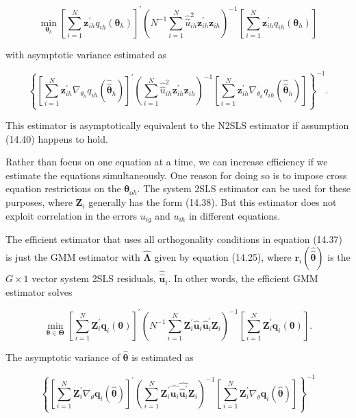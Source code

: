 \documentclass[10pt]{article}
\begin{document}
$$
\min _{\boldsymbol{\theta}_{h}}\left[\sum_{i=1}^{N} \mathbf{z}_{i h}^{\prime} q_{i h}\left(\boldsymbol{\theta}_{h}\right)\right]^{\prime}\left(N^{-1} \sum_{i=1}^{N} \hat{\hat{u}}_{i h}^{2} \mathbf{z}_{i h}^{\prime} \mathbf{z}_{i h}\right)^{-1}\left[\sum_{i=1}^{N} \mathbf{z}_{i h}^{\prime} q_{i h}\left(\boldsymbol{\theta}_{h}\right)\right]
$$

with asymptotic variance estimated as

$$
\left\{\left[\sum_{i=1}^{N} \mathbf{z}_{i h}^{\prime} \nabla_{\theta_{h}} q_{i h}\left(\hat{\hat{\boldsymbol{\theta}}}_{h}\right)\right]^{\prime}\left(\sum_{i=1}^{N} \hat{\hat{u}}_{i h}^{2} \mathbf{z}_{i h}^{\prime} \mathbf{z}_{i h}\right)^{-1}\left[\sum_{i=1}^{N} \mathbf{z}_{i h}^{\prime} \nabla_{\theta_{h}} q_{i h}\left(\hat{\hat{\boldsymbol{\theta}}}_{h}\right)\right]\right\}^{-1} .
$$

This estimator is asymptotically equivalent to the N2SLS estimator if assumption (14.40) happens to hold.

Rather than focus on one equation at a time, we can increase efficiency if we estimate the equations simultaneously. One reason for doing so is to impose cross equation restrictions on the $\boldsymbol{\theta}_{\mathrm{o} h}$. The system 2SLS estimator can be used for these purposes, where $\mathbf{Z}_{i}$ generally has the form (14.38). But this estimator does not exploit correlation in the errors $u_{i g}$ and $u_{i h}$ in different equations.

The efficient estimator that uses all orthogonality conditions in equation (14.37) is just the GMM estimator with $\hat{\boldsymbol{\Lambda}}$ given by equation (14.25), where $\mathbf{r}_{i}(\hat{\hat{\boldsymbol{\theta}}})$ is the $G \times 1$ vector system 2SLS residuals, $\hat{\hat{\mathbf{u}}}_{i}$. In other words, the efficient GMM estimator solves


\begin{equation*}
\min _{\boldsymbol{\theta} \in \boldsymbol{\Theta}}\left[\sum_{i=1}^{N} \mathbf{Z}_{i}^{\prime} \mathbf{q}_{i}(\boldsymbol{\theta})\right]^{\prime}\left(N^{-1} \sum_{i=1}^{N} \mathbf{Z}_{i}^{\prime} \hat{\mathbf{u}}_{i} \hat{\mathbf{u}}_{i}^{\prime} \mathbf{Z}_{i}\right)^{-1}\left[\sum_{i=1}^{N} \mathbf{Z}_{i}^{\prime} \mathbf{q}_{i}(\boldsymbol{\theta})\right] . \tag{14.43}
\end{equation*}


The asymptotic variance of $\hat{\boldsymbol{\theta}}$ is estimated as

$$
\left\{\left[\sum_{i=1}^{N} \mathbf{Z}_{i}^{\prime} \nabla_{\theta} \mathbf{q}_{i}(\hat{\boldsymbol{\theta}})\right]^{\prime}\left(\sum_{i=1}^{N} \mathbf{Z}_{i}^{\prime} \hat{\hat{\mathbf{u}}_{i}} \hat{\hat{\mathbf{u}}_{i}^{\prime}} \mathbf{Z}_{i}\right)^{-1}\left[\sum_{i=1}^{N} \mathbf{Z}_{i}^{\prime} \nabla_{\theta} \mathbf{q}_{i}(\hat{\boldsymbol{\theta}})\right]\right\}^{-1}
$$
\end{document}
